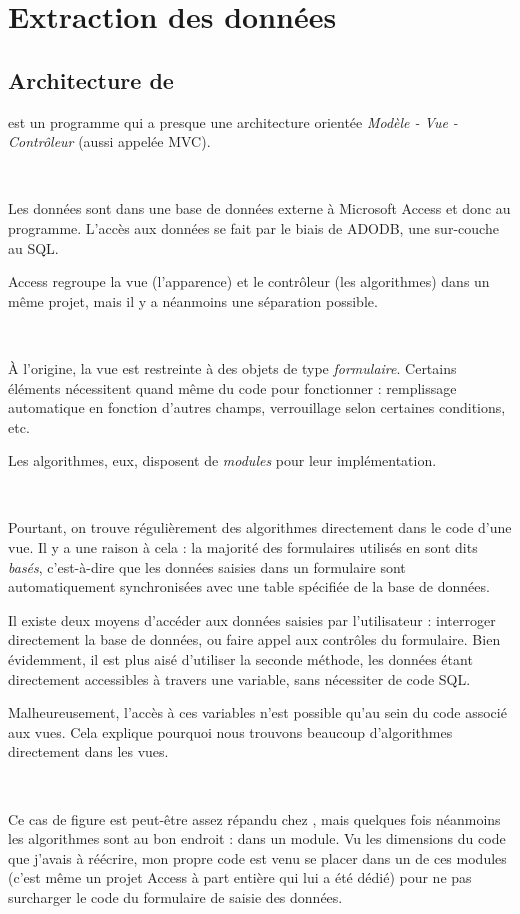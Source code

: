 \chapter{Extraction des données}
\section{Architecture de \integrale}
\integrale{} est un programme qui a presque une architecture orientée \emph{Modèle - Vue - Contrôleur} (aussi appelée MVC).

~

Les données sont dans une base de données externe à Microsoft Access et donc au programme. L'accès aux données se fait par le biais de ADODB, une sur-couche au SQL.

Access regroupe la vue (l'apparence) et le contrôleur (les algorithmes) dans un même projet, mais il y a néanmoins une séparation possible.

~

À l'origine, la vue est restreinte à des objets de type \emph{formulaire}. Certains éléments nécessitent quand même du code pour fonctionner : remplissage automatique en fonction d'autres champs, verrouillage selon certaines conditions, etc.

Les algorithmes, eux, disposent de \emph{modules} pour leur implémentation.

~

Pourtant, on trouve régulièrement des algorithmes directement dans le code d'une vue. Il y a une raison à cela : la majorité des formulaires utilisés en \vb{} sont dits \emph{basés}, c'est-à-dire que les données saisies dans un formulaire sont automatiquement synchronisées avec une table spécifiée de la base de données.

Il existe deux moyens d'accéder aux données saisies par l'utilisateur : interroger directement la base de données, ou faire appel aux contrôles du formulaire. Bien évidemment, il est plus aisé d'utiliser la seconde méthode, les données étant directement accessibles à travers une variable, sans nécessiter de code SQL.

Malheureusement, l'accès à ces variables n'est possible qu'au sein du code associé aux vues. Cela explique pourquoi nous trouvons beaucoup d'algorithmes directement dans les vues.

~

Ce cas de figure est peut-être assez répandu chez \solulog, mais quelques fois néanmoins les algorithmes sont au bon endroit : dans un module. Vu les dimensions du code que j'avais à réécrire, mon propre code est venu se placer dans un de ces modules (c'est même un projet Access à part entière qui lui a été dédié) pour ne pas surcharger le code du formulaire de saisie des données.


